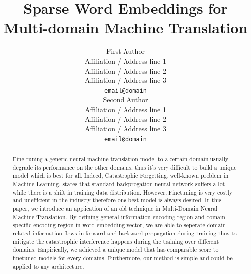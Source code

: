 \documentclass[11pt,a4paper]{article}
\title{Sparse Word Embeddings for Multi-domain Machine Translation}
\author{First Author \\%
  Affiliation / Address line 1 \\
  Affiliation / Address line 2 \\
  Affiliation / Address line 3 \\
  {\tt email@domain} \\\And
  Second Author \\
  Affiliation / Address line 1 \\
  Affiliation / Address line 2 \\
  Affiliation / Address line 3 \\
  {\tt email@domain} \\}
\date{}
\newcommand{\fyTodo}[1]{\Todo[FY:]{\textcolor{orange}{#1}}}
\newcommand{\fyDone}[1]{\done[FY]\Todo[FY:]{\textcolor{orange}{#1}}}
\begin{document}
\maketitle

\fyDone{s/naacl/EMNLP/g}
\fyTodo{Too long, selfcontained, noref, rewrite}
\begin{abstract}
Fine-tuning a generic neural machine translation model to a certain domain usually degrade its performance on the other domains, thus it's very difficult to build a unique model which is best for all. Indeed, Catastrophic Forgetting, well-known problem in Machine Learning, states that standard backprogation neural network suffers a lot while there is a shift in training data distribution. However, Finetuning is very costly and unefficient in the industry therefore one best model is always desired. In this paper, we introduce an application of an old technique \cite{Daume07frustratingly} in Multi-Domain Neural Machine Translation. By defining general information encoding region and domain-specific encoding region in word embedding vector, we are able to seperate domain-related information flows in forward and backward propagation during training thus to
mitigate the catastrophic interference happens during the training over different domains. Empirically, we achieved a unique model that has comparable score to finetuned models for every domains. Furthermore, our method is simple and could be applied to any architecture.
\end{abstract}
\end{document}
